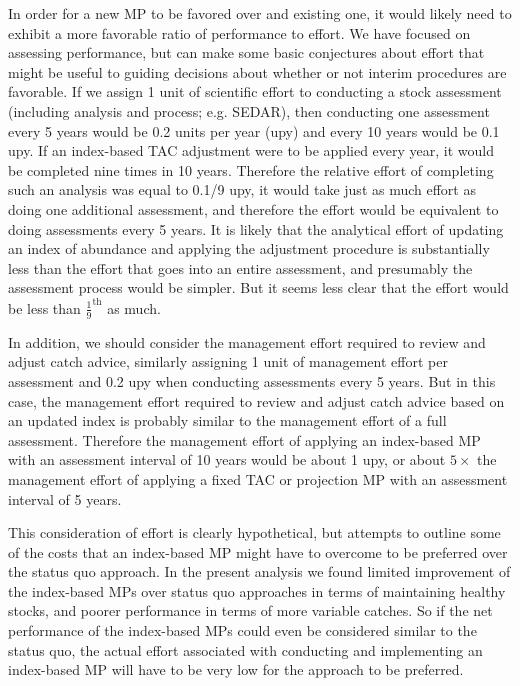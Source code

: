 \documentclass[12pt,english]{article}
\begin{document}
\begin{flushleft}
\begin{spacing}{1.9}
In order for a new MP to be favored over and existing one, it would likely need to exhibit a more favorable ratio of performance to effort. We have focused on assessing performance, but can make some basic conjectures about effort that might be useful to guiding decisions about whether or not interim procedures are favorable. If we assign 1 unit of scientific effort to conducting a stock assessment (including analysis and process; e.g. SEDAR), then conducting one assessment every 5 years would be 0.2 units per year (upy) and every 10 years would be 0.1 upy. If an index-based TAC adjustment were to be applied every year, it would be completed nine times in 10 years. Therefore the relative effort of completing such an analysis was equal to 0.1/9 upy, it would take just as much effort as doing one additional assessment, and therefore the effort would be equivalent to doing assessments every 5 years. It is likely that the analytical effort of updating an index of abundance and applying the adjustment procedure is substantially less than the effort that goes into an entire assessment, and presumably the assessment process would be simpler. But it seems less clear that the effort would be less than $\frac{1}{9}^{\mathrm{th}}$ as much.

In addition, we should consider the management effort required to review and adjust catch advice, similarly assigning 1 unit of management effort per assessment and 0.2 upy when conducting assessments every 5 years. But in this case, the management effort required to review and adjust catch advice based on an updated index is probably similar to the management effort of a full assessment. Therefore the management effort of applying an index-based MP with an assessment interval of 10 years would be about 1 upy, or about $5\times$ the management effort of applying a fixed TAC or projection MP with an assessment interval of 5 years.

This consideration of effort is clearly hypothetical, but attempts to outline some of the costs that an index-based MP might have to overcome to be preferred over the status quo approach. In the present analysis we found limited improvement of the index-based MPs over status quo approaches in terms of maintaining healthy stocks, and poorer performance in terms of more variable catches. So if the net performance of the index-based MPs could even be considered similar to the status quo, the actual effort associated with conducting and implementing an index-based MP will have to be very low for the approach to be preferred.




\end{spacing}
\end{flushleft}
\end{document}
